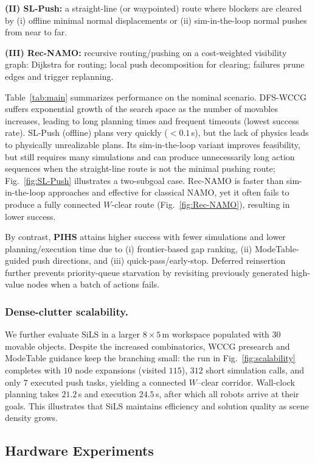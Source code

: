 \textbf{(II) SL-Push:} a straight-line (or waypointed) route where blockers are cleared by (i) offline minimal normal displacements or (ii) sim-in-the-loop normal pushes from near to far.

\textbf{(III) Rec-NAMO:} recursive routing/pushing on a cost-weighted visibility graph: Dijkstra for routing; local push decomposition for clearing; failures prune edges and trigger replanning.

Table~\ref{tab:main} summarizes performance on the nominal scenario. DFS-WCCG suffers exponential growth of the search space as the number of movables increases, leading to long planning times and frequent timeouts (lowest success rate). SL-Push (offline) plans very quickly ($<0.1$\,s), but the lack of physics leads to physically unrealizable plans. Its sim-in-the-loop variant improves feasibility, but still requires many simulations and can produce unnecessarily long action sequences when the straight-line route is not the minimal pushing route; Fig.~\ref{fig:SL-Push} illustrates a two-subgoal case. Rec-NAMO is faster than sim-in-the-loop approaches and effective for classical NAMO, yet it often fails to produce a fully connected $W$-clear route (Fig.~\ref{fig:Rec-NAMO}), resulting in lower success. 

By contrast, \textbf{PIHS} attains higher success with fewer simulations and lower planning/execution time due to (i) frontier-based gap ranking, (ii) ModeTable-guided push directions, and (iii) quick-pass/early-stop. Deferred reinsertion further prevents priority-queue starvation by revisiting previously generated high-value nodes when a batch of actions fails.

\subsubsection{Dense-clutter scalability.}
We further evaluate SiLS in a larger $8{\times}5$\,m workspace populated with $30$ movable objects.
Despite the increased combinatorics, WCCG presearch and ModeTable guidance keep the branching small:
the run in Fig.~\ref{fig:scalability} completes with $10$ node expansions (visited $115$), $312$ short simulation calls,
and only $7$ executed push tasks, yielding a connected $W$–clear corridor.
Wall-clock planning takes $21.2$\,s and execution $24.5$\,s, after which all robots arrive at their goals.
This illustrates that SiLS maintains efficiency and solution quality as scene density grows.
\subsection{Hardware Experiments}\label{subsec:hardware}

